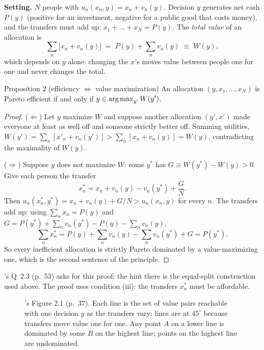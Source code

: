 \textbf{Setting.} $N$ people with $u_n(x_n, y) = x_n + v_n(y)$. Decision $y$ generates net cash
$P(y)$ (positive for an investment, negative for a public good that costs money), and the
transfers must add up: $x_1 + \dots + x_N = P(y)$. The \emph{total value} of an allocation is
\[
  \sum_{n} \big[x_n + v_n(y)\big] \;=\; P(y) + \sum_n v_n(y) \;\equiv\; W(y),
\]
which depends on $y$ alone: changing the $x$'s moves value between people one for one and never
changes the total.

\begin{prop}{Proposition 2 (efficiency $\Leftrightarrow$ value maximization)}
An allocation $(y, x_1, \dots, x_N)$ is Pareto efficient if and only if $y \in \operatorname*{arg\,max}_{y'} W(y')$.
\end{prop}

\begin{proof}
($\Leftarrow$) Let $y$ maximize $W$ and suppose another allocation $(y', x')$ made everyone at
least as well off and someone strictly better off. Summing utilities,
$W(y') = \sum_n [x'_n + v_n(y')] > \sum_n [x_n + v_n(y)] = W(y)$, contradicting the maximality of
$W(y)$.

($\Rightarrow$) Suppose $y$ does not maximize $W$: some $y^*$ has $G \equiv W(y^*) - W(y) > 0$.
Give each person the transfer
\[
  x^*_n = x_n + v_n(y) - v_n(y^*) + \frac{G}{N}.
\]
Then $u_n(x^*_n, y^*) = x_n + v_n(y) + G/N > u_n(x_n, y)$ for every $n$. The transfers add up:
using $\sum_n x_n = P(y)$ and $G = P(y^*) + \sum_n v_n(y^*) - P(y) - \sum_n v_n(y)$,
\[
  \sum_n x^*_n = P(y) + \sum_n v_n(y) - \sum_n v_n(y^*) + G = P(y^*).
\]
So every inefficient allocation is strictly Pareto dominated by a value-maximizing one, which is
the second sentence of the principle.
\end{proof}

\MR's Q~2.3 (p.~53) asks for this proof; the hint there is the equal-split construction used
above. The proof uses condition (iii): the transfers $x^*_n$ must be affordable.

\begin{figure}[ht]
\centering
{}
\caption{\MR's Figure 2.1 (p.~37). Each line is the set of value pairs reachable with one
decision $y$ as the transfers vary; lines are at $45^\circ$ because transfers move value one for
one. Any point $A$ on a lower line is dominated by some $B$ on the highest line; points on the
highest line are undominated.}
\end{figure}

